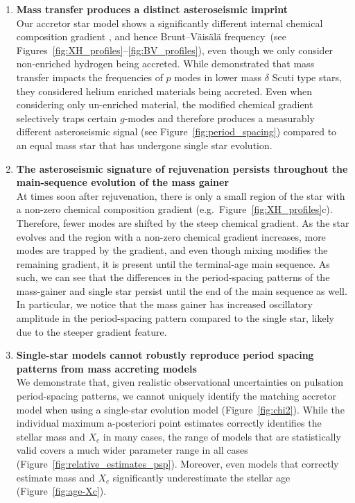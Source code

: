 \documentclass[desactivate]{aa}
\begin{document}
\begin{enumerate}
    \setlength\itemsep{1em}
    \item \textbf{Mass transfer produces a distinct asteroseismic imprint}\\Our accretor star model shows a significantly different internal chemical composition gradient \citep[e.g.][]{Renzo+2021}, and hence Brunt–Väisälä frequency\ (see Figures~\ref{fig:XH_profiles}--\ref{fig:BV_profiles}), even though we only consider non-enriched hydrogen being accreted. While \citet{Miszuda+2021} demonstrated that mass transfer impacts the frequencies of $p$ modes in lower mass $\delta$ Scuti type stars, they considered helium enriched materials being accreted. Even when considering only un-enriched material, the modified chemical gradient selectively traps certain $g$-modes and therefore produces a measurably different asteroseismic signal (see Figure~\ref{fig:period_spacing}) compared to an equal mass star that has undergone single star evolution.
    \item {\bf The asteroseismic signature of rejuvenation persists throughout the main-sequence evolution of the mass gainer}\\ At times soon after rejuvenation, there is only a small region of the star with a non-zero chemical composition gradient (e.g.\ Figure~\ref{fig:XH_profiles}c). Therefore, fewer modes are shifted by the steep chemical gradient. As the star evolves and the region with a non-zero chemical gradient increases, more modes are trapped by the gradient, and even though mixing modifies the remaining gradient, it is present until the terminal-age main sequence. As such, we can see that the differences in the period-spacing patterns of the mass-gainer and single star persist until the end of the main sequence as well. In particular, we notice that the mass gainer has increased oscillatory amplitude in the period-spacing pattern compared to the single star, likely due to the steeper gradient feature.
    \item {\bf Single-star models cannot robustly reproduce period spacing patterns from mass accreting models}\\We demonstrate that, given realistic observational uncertainties on pulsation period-spacing patterns, we cannot uniquely identify the matching accretor model when using a single-star evolution model (Figure~\ref{fig:chi2}). While the individual maximum a-posteriori point estimates correctly identifies the stellar mass and $X_c$ in many cases, the range of models that are statistically valid covers a much wider parameter range in all cases (Figure~\ref{fig:relative_estimates_psp}). Moreover, even models that correctly estimate mass and $X_c$ significantly underestimate the stellar age (Figure~\ref{fig:age-Xc}).


\end{enumerate}
\end{document}
